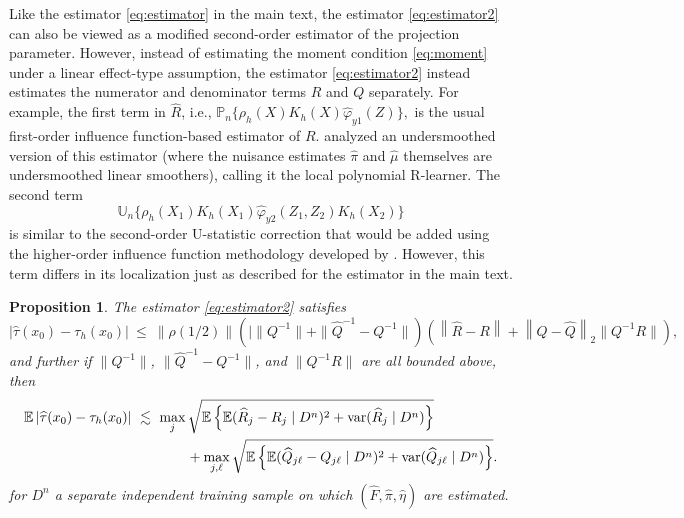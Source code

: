 \documentclass[11pt,twoside]{article}
\newcommand{\var}{\text{var}}
\newcommand{\Pn}{\mathbb{P}_n}
\newcommand{\Un}{\mathbb{U}_n}
\newcommand{\E}{\mathbb{E}}
\newtheorem{propositionapp}{Proposition}
\theoremstyle{definition}
\theoremstyle{remark}
\begin{document}
Like the estimator \eqref{eq:estimator} in the main text, the estimator \eqref{eq:estimator2}  can also be viewed as a modified second-order estimator of the projection parameter. However, instead of estimating the moment condition \eqref{eq:moment} under a linear effect-type assumption, the estimator \eqref{eq:estimator2} instead estimates the numerator and denominator terms $R$ and $Q$ separately. For example, the first term in $\widehat{R}$, i.e., 
$\Pn \{ \rho_h(X) K_h(X)  \widehat\varphi_{y1}(Z) \} , $
is the usual first-order influence function-based estimator of $R$. \citet{kennedy2023towards} analyzed an undersmoothed version of this  estimator (where the nuisance estimates $\widehat\pi$ and $\widehat\mu$ themselves are undersmoothed linear smoothers), calling it the local polynomial R-learner. 
The second term 
$$ \Un  \Big\{  \rho_h(X_1) K_h(X_1) \widehat\varphi_{y2}(Z_1,Z_2) K_h(X_2) \Big\} $$
is similar to the second-order U-statistic correction that would be added using the higher-order influence function methodology developed by \citet{robins2008higher, robins2009quadratic, robins2017minimax}. However,  this term differs in its localization just as described for the estimator in the main text. \\


\begin{propositionapp} \label{prop:qrerror2}
The estimator \eqref{eq:estimator2} satisfies
$$ \left| \widehat\tau(x_0) - \tau_h(x_0) \right| \ \leq \ \|\rho(1/2) \| \left(|  \| Q^{-1} \| +   \| \widehat{Q}^{-1} - {Q}^{-1} \| \right) \left( \left\| \widehat{R} - R \right\|  + \left\|  Q - \widehat{Q} \right\|_2 \| Q^{-1} R \| \right) , $$
and further if 
 $\| Q^{-1} \|$, $ \| \widehat{Q}^{-1} - {Q}^{-1} \|$, and $\|Q^{-1} R\| $ are all bounded above, 
then
\begin{align*}
\E \left| \widehat\tau(x_0) - \tau_h(x_0) \right| \ &\lesssim \  \max_j  \sqrt{ \E\left\{ \E(\widehat{R}_j - R_j \mid D^n)^2 + \var(\widehat{R}_j \mid D^n) \right\} }   \\
& \hspace{.5in} + \max_{j,\ell} \sqrt{ \E\left\{ \E(\widehat{Q}_{j\ell} - Q_{j\ell} \mid D^n)^2 + \var(\widehat{Q}_{j\ell} \mid D^n) \right\} } .
\end{align*}
for $D^n$  a separate independent training sample on which $( \widehat{F}, \widehat\pi,\widehat\eta)$ are estimated. \\
\end{propositionapp}

\bigskip
\end{document}
